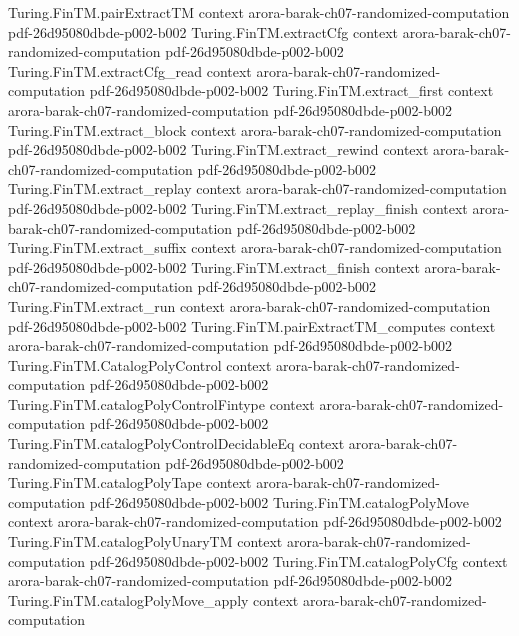 \begin{theorem}
\proofstep
  {Turing.FinTM.pairExtractTM}
  {context}
  {arora-barak-ch07-randomized-computation}
  {pdf-26d95080dbde-p002-b002}
\proofstep
  {Turing.FinTM.extractCfg}
  {context}
  {arora-barak-ch07-randomized-computation}
  {pdf-26d95080dbde-p002-b002}
\proofstep
  {Turing.FinTM.extractCfg_read}
  {context}
  {arora-barak-ch07-randomized-computation}
  {pdf-26d95080dbde-p002-b002}
\proofstep
  {Turing.FinTM.extract_first}
  {context}
  {arora-barak-ch07-randomized-computation}
  {pdf-26d95080dbde-p002-b002}
\proofstep
  {Turing.FinTM.extract_block}
  {context}
  {arora-barak-ch07-randomized-computation}
  {pdf-26d95080dbde-p002-b002}
\proofstep
  {Turing.FinTM.extract_rewind}
  {context}
  {arora-barak-ch07-randomized-computation}
  {pdf-26d95080dbde-p002-b002}
\proofstep
  {Turing.FinTM.extract_replay}
  {context}
  {arora-barak-ch07-randomized-computation}
  {pdf-26d95080dbde-p002-b002}
\proofstep
  {Turing.FinTM.extract_replay_finish}
  {context}
  {arora-barak-ch07-randomized-computation}
  {pdf-26d95080dbde-p002-b002}
\proofstep
  {Turing.FinTM.extract_suffix}
  {context}
  {arora-barak-ch07-randomized-computation}
  {pdf-26d95080dbde-p002-b002}
\proofstep
  {Turing.FinTM.extract_finish}
  {context}
  {arora-barak-ch07-randomized-computation}
  {pdf-26d95080dbde-p002-b002}
\proofstep
  {Turing.FinTM.extract_run}
  {context}
  {arora-barak-ch07-randomized-computation}
  {pdf-26d95080dbde-p002-b002}
\proofstep
  {Turing.FinTM.pairExtractTM_computes}
  {context}
  {arora-barak-ch07-randomized-computation}
  {pdf-26d95080dbde-p002-b002}
\proofstep
  {Turing.FinTM.CatalogPolyControl}
  {context}
  {arora-barak-ch07-randomized-computation}
  {pdf-26d95080dbde-p002-b002}
\proofstep
  {Turing.FinTM.catalogPolyControlFintype}
  {context}
  {arora-barak-ch07-randomized-computation}
  {pdf-26d95080dbde-p002-b002}
\proofstep
  {Turing.FinTM.catalogPolyControlDecidableEq}
  {context}
  {arora-barak-ch07-randomized-computation}
  {pdf-26d95080dbde-p002-b002}
\proofstep
  {Turing.FinTM.catalogPolyTape}
  {context}
  {arora-barak-ch07-randomized-computation}
  {pdf-26d95080dbde-p002-b002}
\proofstep
  {Turing.FinTM.catalogPolyMove}
  {context}
  {arora-barak-ch07-randomized-computation}
  {pdf-26d95080dbde-p002-b002}
\proofstep
  {Turing.FinTM.catalogPolyUnaryTM}
  {context}
  {arora-barak-ch07-randomized-computation}
  {pdf-26d95080dbde-p002-b002}
\proofstep
  {Turing.FinTM.catalogPolyCfg}
  {context}
  {arora-barak-ch07-randomized-computation}
  {pdf-26d95080dbde-p002-b002}
\proofstep
  {Turing.FinTM.catalogPolyMove_apply}
  {context}
  {arora-barak-ch07-randomized-computation}

\end{theorem}
